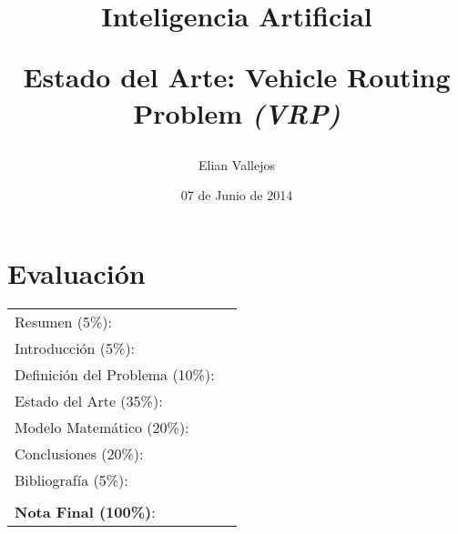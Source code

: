 \documentclass[letter, 10pt]{article}
\begin{document}
\title{Inteligencia Artificial \\ \begin{Large}Estado del Arte: Vehicle Routing Problem \emph{(VRP)}\end{Large}}
\author{Elian Vallejos}
\date{07 de Junio de 2014}
\maketitle


\section*{Evaluaci\'on}

\begin{tabular}{ll}
Resumen (5\%): & \underline{\hspace{2cm}} \\
Introducci\'on (5\%):  & \underline{\hspace{2cm}} \\
Definici\'on del Problema (10\%):  & \underline{\hspace{2cm}} \\
Estado del Arte (35\%):  & \underline{\hspace{2cm}} \\
Modelo Matem\'atico (20\%): &  \underline{\hspace{2cm}}\\
Conclusiones (20\%): &  \underline{\hspace{2cm}}\\
Bibliograf\'ia (5\%): & \underline{\hspace{2cm}}\\
 &  \\
\textbf{Nota Final (100\%)}:   & \underline{\hspace{2cm}}
\end{tabular}
\vspace{2cm}
\end{document}
